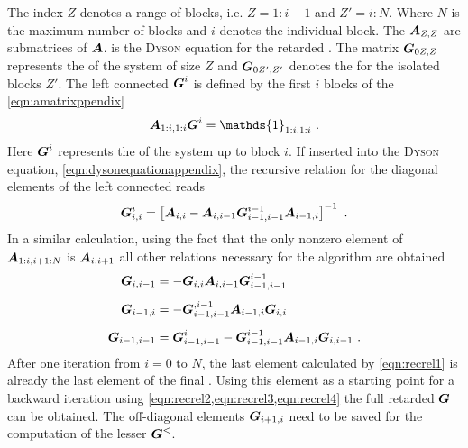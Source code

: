 The index $Z$ denotes a range of blocks, i.e. $Z = 1:i-1$ and $Z'=i:N$. Where $N$ is the maximum number of blocks and $i$ denotes the individual block. The $\boldsymbol{A}_{Z,Z}$ are submatrices of $\boldsymbol{A}$.  is the \textsc{Dyson} equation for the retarded \gfnc{}. The matrix $\boldsymbol{G}_{0 Z,Z}$ represents the \gfnc{} of the system of size $Z$ and $\boldsymbol{G}_{0 Z',Z'}$ denotes the \gfnc{} for the isolated blocks $Z'$.
The left connected \gfnc{} $\boldsymbol{G}^i$ is defined by the first $i$ blocks of the \cref{eqn:amatrixppendix} 
\begin{align}
\mat{A}_{1:i,1:i}\mat{G}^{i}=\mathds{1}_{1:i,1:i}\ .
\end{align}
Here $\boldsymbol{G}^i$ represents the \gfnc{} of the system up to block $i$.
If inserted into the \textsc{Dyson} equation, \cref{eqn:dysonequationappendix}, the recursive relation for the diagonal elements of the left connected \gfnc{} reads
\begin{align}
  \mat{G}^{i}_{i,i} = \left[\mat{A}_{i,i}-\mat{A}_{i,i-1}\mat{G}^{i-1}_{i-1,i-1}\mat{A}_{i-1,i}\right]^{-1}\ .
  \label{eqn:recrel1}
\end{align}
In a similar calculation, using the fact that the only nonzero element of $\boldsymbol{A}_{1:i,i+1:N}$ is $\boldsymbol{A}_{i,i+1}$ all other relations necessary for the algorithm are obtained
\begin{align}
  \mat{G}_{i,i-1} &= -\mat{G}_{i,i}\mat{A}_{i,i-1}\mat{G}^{i-1}_{i-1,i-1}\label{eqn:recrel2}\\\addlinespace
  \mat{G}_{i-1,i} &= -\mat{G}^{,i-1}_{i-1,i-1}\mat{A}_{i-1,i} \mat{G}_{i,i}\label{eqn:recrel3}\\\addlinespace
  \mat{G}_{i-1,i-1} &= \mat{G}^{i}_{i-1,i-1}-\mat{G}^{i-1}_{i-1,i-1}\mat{A}_{i-1,i}\mat{G}_{i,i-1}\label{eqn:recrel4}\ .
\end{align}
After one iteration from $i=0$ to $N$, the last element calculated by \cref{eqn:recrel1} is already the last element of the final \gfnc{}. Using this element as a starting point for a backward iteration using \cref{eqn:recrel2,eqn:recrel3,eqn:recrel4} the full retarded \gfnc{} $\boldsymbol{G}$ can be obtained. The off-diagonal elements $\boldsymbol{G}_{i+1,i}$ need to be saved for the computation of the lesser \gfnc{} $\boldsymbol{G}^<$.
